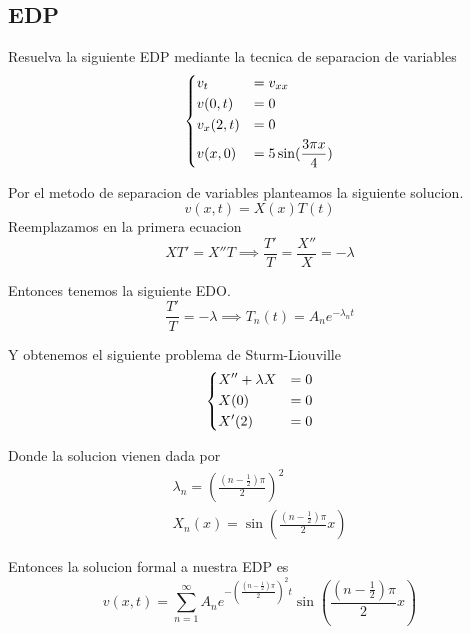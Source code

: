 \message{ !name(MAT024.tex)}\documentclass[../main.tex]{subfiles}
\begin{document}
\subsection{EDP}
\begin{problem}
  Resuelva la siguiente EDP mediante la tecnica de separacion de variables
  \begin{equation*}
    \begin{dcases}
      v_{t} &= v_{xx}\\
      v(0, t) &= 0\\
      v_{x}(2, t) &= 0\\
      v(x, 0) &= 5 \sin(\frac{3\pi x}{4})
    \end{dcases}
  \end{equation*}
\end{problem}
\begin{solution}
  Por el metodo de separacion de variables planteamos la siguiente solucion.
  \begin{equation*}
    v(x, t) = X(x)T(t)
  \end{equation*}
  Reemplazamos en la primera ecuacion
  \begin{equation*}
    XT' = X''T \implies \frac{T'}{T} = \frac{X''}{X} = - \lambda
  \end{equation*}

  Entonces tenemos la siguiente EDO.
  \begin{equation*}
    \frac{T'}{T} = -\lambda \implies T_{n}(t) = A_{n}e^{-\lambda_{n} t}
  \end{equation*}

  Y obtenemos el siguiente problema de Sturm-Liouville
  \begin{equation*}
    \begin{dcases}
      X'' + \lambda X &= 0\\
      X(0) &= 0\\
      X'(2) &= 0
    \end{dcases}
  \end{equation*}

  Donde la solucion vienen dada por
  \begin{gather*}
    \lambda_{n} = (\frac{(n - \frac12)\pi}{2})^{2}\\
    X_{n}(x) = \sin(\frac{(n - \frac12)\pi}{2} x)
  \end{gather*}

  Entonces la solucion formal a nuestra EDP es
  \begin{equation*}
    v(x, t) = \sum_{n = 1}^{\infty} A_{n}e^{-(\frac{(n - \frac12)\pi}{2})^{2} t} \sin(\frac{(n - \frac12)\pi}{2} x)
  \end{equation*}


\end{solution}
\end{document}
